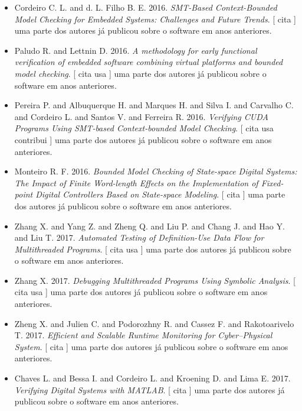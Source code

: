 \begin{itemize}
\item Cordeiro C. L. and d. L. Filho B. E.
      2016.
        \textit{ SMT-Based Context-Bounded Model Checking for Embedded Systems: Challenges and Future Trends}.
      [
          cita
      ]
uma parte dos autores já publicou sobre o software em anos anteriores.
\item Paludo R. and Lettnin D.
      2016.
        \textit{ A methodology for early functional verification of embedded software combining virtual platforms and bounded model checking}.
      [
          cita
          usa
      ]
uma parte dos autores já publicou sobre o software em anos anteriores.
\item Pereira P. and Albuquerque H. and Marques H. and Silva I. and Carvalho C. and Cordeiro L. and Santos V. and Ferreira R.
      2016.
        \textit{ Verifying CUDA Programs Using SMT-based Context-bounded Model Checking}.
      [
          cita
          usa
          contribui
      ]
uma parte dos autores já publicou sobre o software em anos anteriores.
\item Monteiro R. F.
      2016.
        \textit{ Bounded Model Checking of State-space Digital Systems: The Impact of Finite Word-length Effects on the Implementation of Fixed-point Digital Controllers Based on State-space Modeling}.
      [
          cita
      ]
uma parte dos autores já publicou sobre o software em anos anteriores.
\item Zhang X. and Yang Z. and Zheng Q. and Liu P. and Chang J. and Hao Y. and Liu T.
      2017.
        \textit{ Automated Testing of Definition-Use Data Flow for Multithreaded Programs}.
      [
          cita
          usa
      ]
uma parte dos autores já publicou sobre o software em anos anteriores.
\item Zhang X.
      2017.
        \textit{ Debugging Multithreaded Programs Using Symbolic Analysis}.
      [
          cita
          usa
      ]
uma parte dos autores já publicou sobre o software em anos anteriores.
\item Zheng X. and Julien C. and Podorozhny R. and Cassez F. and Rakotoarivelo T.
      2017.
        \textit{ Efficient and Scalable Runtime Monitoring for Cyber--Physical System}.
      [
          cita
      ]
uma parte dos autores já publicou sobre o software em anos anteriores.
\item Chaves L. and Bessa I. and Cordeiro L. and Kroening D. and Lima E.
      2017.
        \textit{ Verifying Digital Systems with MATLAB}.
      [
          cita
      ]
uma parte dos autores já publicou sobre o software em anos anteriores.
\end{itemize}
